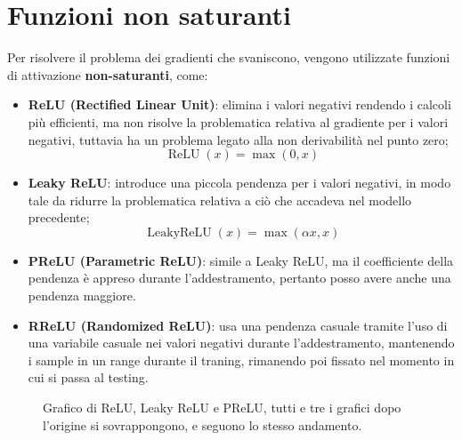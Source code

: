 \section{Funzioni non saturanti}
Per risolvere il problema dei gradienti che svaniscono, vengono utilizzate funzioni di attivazione \textbf{non-saturanti}, come:
\begin{itemize}
    \item \textbf{ReLU (Rectified Linear Unit)}: elimina i valori negativi rendendo i calcoli più efficienti, ma non risolve la problematica relativa al gradiente per i valori negativi, tuttavia ha un problema legato alla non derivabilità nel punto zero;
    \begin{equation}
        \operatorname{ReLU}(x) = \max(0, x)
    \end{equation}
    \item \textbf{Leaky ReLU}: introduce una piccola pendenza per i valori negativi, in modo tale da ridurre la problematica relativa a ciò che accadeva nel modello precedente;
    \begin{equation}
        \operatorname{LeakyReLU}(x) = \max(\alpha x, x)
    \end{equation}
    \item \textbf{PReLU (Parametric ReLU)}: simile a Leaky ReLU, ma il coefficiente della pendenza è appreso durante l'addestramento, pertanto posso avere anche una pendenza maggiore.
    \item \textbf{RReLU (Randomized ReLU)}: usa una pendenza casuale tramite l'uso di una variabile casuale nei valori negativi durante l'addestramento, mantenendo i sample in un range durante il traning, rimanendo poi fissato nel momento in cui si passa al testing.
\end{itemize}

\begin{figure}[h]
    \centering
    \caption{Grafico di ReLU, Leaky ReLU e PReLU, tutti e tre i grafici dopo l'origine si sovrappongono, e seguono lo stesso andamento.}
\end{figure}

